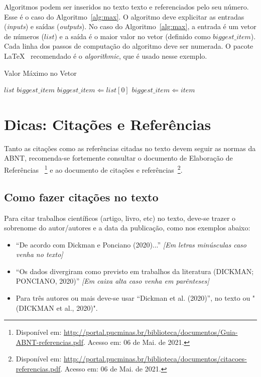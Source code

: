 \documentclass[a4paper,12pt]{article}
\begin{document}
	Algoritmos podem ser inseridos no texto texto e referenciados pelo seu número. Esse é o caso do Algoritmo~\ref{alg:max}. O algoritmo deve explicitar as entradas (\textit{inputs}) e saídas (\textit{outputs}). No caso do Algoritmo~\ref{alg:max}, a entrada é um vetor de números ($list$) e a saída é o maior valor no vetor (definido como $biggest\_item$). Cada linha dos passos de computação do algoritmo deve ser numerada. O pacote \LaTeX~ recomendado é o \textit{algorithmic}, que é usado nesse exemplo.
	
	\begin{algorithm}
		\caption{Valor Máximo no Vetor}
		\label{alg:max}
		\begin{algorithmic}[1]
			\REQUIRE $list$
			\ENSURE $biggest\_item$
			\STATE $biggest\_item \Leftarrow list[0]$
			\STATE $biggest\_item \Leftarrow item$
			\ENDIF
			\ENDFOR
		\end{algorithmic}
	\end{algorithm}
	
	\section{Dicas: Citações e Referências}
	\label{sec:ref}
	
	Tanto as citações como as referências citadas no texto devem seguir as normas da ABNT, recomenda-se fortemente consultar o documento de Elaboração de Referências~\cite{manualpucref} \footnote{Disponível em: \url{http://portal.pucminas.br/biblioteca/documentos/Guia-ABNT-referencias.pdf}. Acesso em: 06 de Mai. de 2021.} e ao documento de citações e referências~\cite{manualpuccit}\footnote{Disponível em: \url{http://portal.pucminas.br/biblioteca/documentos/citacoes-referencias.pdf}. Acesso em: 06 de Mai. de 2021.}.
	
	\subsection{Como fazer citações no texto}
	
	Para citar trabalhos científicos (artigo, livro, etc) no texto, deve-se trazer o sobrenome do autor/autores e a data da publicação, como nos exemplos abaixo:
	
	\begin{itemize}
		\item ``De acordo com Dickman e Ponciano (2020)...'' \textit{[Em letras minúsculas caso venha no texto]}
		\item ``Os dados divergiram como previsto em trabalhos da literatura (DICKMAN; PONCIANO, 2020)'' \textit{[Em caixa alta caso venha em parênteses]}
		\item Para três autores ou mais deve-se usar ``Dickman et al. (2020)'', no texto ou "(DICKMAN et al., 2020)".
	\end{itemize}
	
\end{document}
